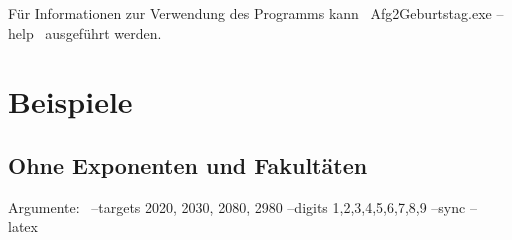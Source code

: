 \documentclass{article}
\theoremstyle{nonumberplain}
\begin{document}
Für Informationen zur Verwendung des Programms kann ~Afg2Geburtstag.exe --help~ ausgeführt werden.

\section{Beispiele}

\subsection{Ohne Exponenten und Fakultäten}

Argumente:
~--targets 2020, 2030, 2080, 2980 --digits 1,2,3,4,5,6,7,8,9 --sync --latex~

%
\end{document}
